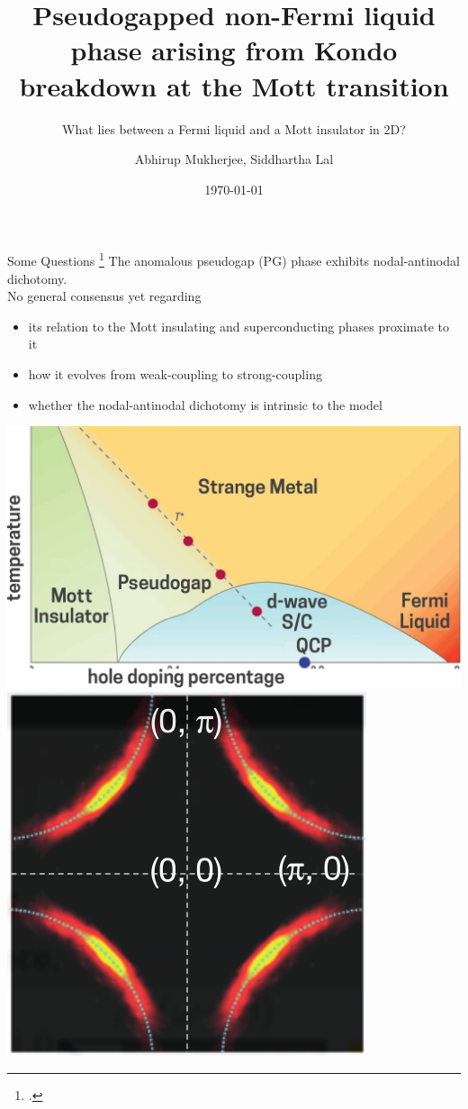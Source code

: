 \documentclass[10pt,aspectratio=169]{beamer}
\title{Pseudogapped non-Fermi liquid phase arising from Kondo breakdown at the Mott transition}
\subtitle{What lies between a Fermi liquid and a Mott insulator in 2D?}
\author{Abhirup Mukherjee, Siddhartha Lal}
\institute
{
	Department of Physical Sciences,\\
	Indian Institute of Science Education and Research Kolkata
}
\date{\today}
\begin{document}
\begin{frame}
    \titlepage
\end{frame}

\begin{frame}{Some Questions}
\footcite{keimer2015quantum,ProustTaillefer2019,loeserKapitulnik1996,Norman1998,Hashimoto2014,KyungKotliar2006,MacridinAzevedo2006,WuFerrero2018,anirbanmott2,HilleAndergassen2020}
The anomalous \alert{pseudogap} (PG) phase exhibits nodal-antinodal dichotomy.\\[5pt]

No general consensus yet regarding
\begin{itemize}
	\item its \alert{relation} to the Mott insulating and superconducting phases proximate to it
	\item how it \alert{evolves} from weak-coupling to strong-coupling
	\item whether the \alert{nodal-antinodal dichotomy} is intrinsic
to the model
\end{itemize}

\begin{center}
\includegraphics[height=0.2\textwidth]{cuprates.pdf}
\includegraphics[height=0.2\textwidth]{fermiArc1.png}
\end{center}

\end{frame}
\end{document}
